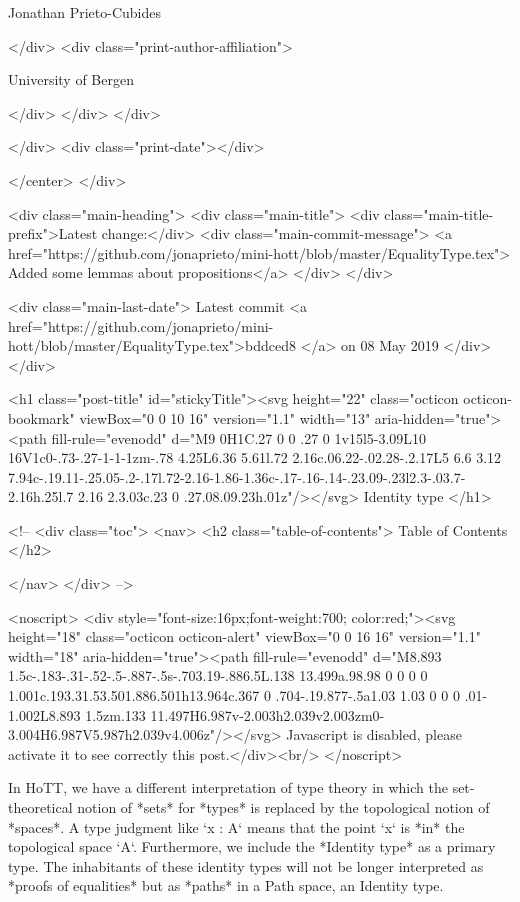                   Jonathan Prieto-Cubides
                
              </div>
              <div class="print-author-affiliation">
                
                  University of Bergen
                
                </div>
            </div>
          </div>
          
          
        </div>
        <div class="print-date"></div>
        
        
    </center>
  </div>

  
  <div class="main-heading">
    <div class="main-title">
      <div class="main-title-prefix">Latest change:</div>
      <div class="main-commit-message">
            <a href="https://github.com/jonaprieto/mini-hott/blob/master/EqualityType.tex">
              Added some lemmas about propositions</a>
      </div>
    </div>

    <div class="main-last-date">
      Latest commit <a href="https://github.com/jonaprieto/mini-hott/blob/master/EqualityType.tex">bddced8 </a> on  08 May 2019
    </div>
  </div>
  
  <h1 class="post-title" id="stickyTitle"><svg height="22" class="octicon octicon-bookmark" viewBox="0 0 10 16" version="1.1" width="13" aria-hidden="true"><path fill-rule="evenodd" d="M9 0H1C.27 0 0 .27 0 1v15l5-3.09L10 16V1c0-.73-.27-1-1-1zm-.78 4.25L6.36 5.61l.72 2.16c.06.22-.02.28-.2.17L5 6.6 3.12 7.94c-.19.11-.25.05-.2-.17l.72-2.16-1.86-1.36c-.17-.16-.14-.23.09-.23l2.3-.03.7-2.16h.25l.7 2.16 2.3.03c.23 0 .27.08.09.23h.01z"/></svg> Identity type
  </h1>

  <!-- 
  <div class="toc">
    <nav>
    <h2 class="table-of-contents"> Table of Contents </h2>
      

    </nav>
  </div>
   -->

  <noscript>
  <div style="font-size:16px;font-weight:700; color:red;"><svg height="18" class="octicon octicon-alert" viewBox="0 0 16 16" version="1.1" width="18" aria-hidden="true"><path fill-rule="evenodd" d="M8.893 1.5c-.183-.31-.52-.5-.887-.5s-.703.19-.886.5L.138 13.499a.98.98 0 0 0 0 1.001c.193.31.53.501.886.501h13.964c.367 0 .704-.19.877-.5a1.03 1.03 0 0 0 .01-1.002L8.893 1.5zm.133 11.497H6.987v-2.003h2.039v2.003zm0-3.004H6.987V5.987h2.039v4.006z"/></svg> Javascript is disabled, please activate it to see correctly this post.</div><br/>
  </noscript>

  In HoTT, we have a different interpretation of type theory in which the
set-theoretical notion of *sets* for *types* is replaced by the topological
notion of *spaces*. A type judgment like `x : A` means that the point `x`‌‌ is
*in* the topological space `A`‌‌. Furthermore, we include the *Identity type* as
a primary type. The inhabitants of these identity types will not be longer
interpreted as *proofs of equalities* but as *paths* in a Path space, an
Identity type.

